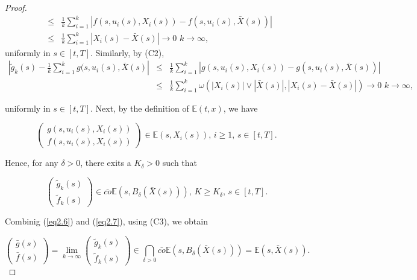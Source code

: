 \begin{proof}
\begin{eqnarray*}
            &\leq& \frac{1}{k}\sum_{i=1}^{k}|f(s,u_i(s),X_i(s))-f(s,u_i(s),\bar{X}(s))| \\
            &\leq&\frac{1}{k}\sum_{i=1}^{k}|X_i(s)-\bar{X}(s)|\to 0\,\,k\to \infty,
        \end{eqnarray*}
        uniformly in $s\in [t,T]$. Similarly, by (C2),
        \begin{eqnarray*}
        	|\tilde{g}_k(s)-\frac{1}{k}\sum_{i=1}^{k}g(s,u_i(s),\bar{X}(s)|&\leq& \frac{1}{k}\sum_{i=1}^{k}|g(s,u_i(s),X_i(s))-g(s,u_i(s),\bar{X}(s))|\\
        	&\leq&\frac{1}{k}\sum_{i=1}^{k}\omega(|X_i(s)|\vee |\bar{X}(s)|,%
        	|X_i(s)-\bar{X}(s)|)\to 0\,\,k\to \infty,
        \end{eqnarray*}
        
        uniformly in $s\in [t,T]$. Next, by the definition of $\mathbb{E}(t,x)$, we have
        
        $$\begin{pmatrix}
        	g(s,u_i(s),X_i(s)) \\ f(s,u_i(s),X_i(s))
        \end{pmatrix} \in \mathbb{E}(s,X_i(s)),\,i\geq 1,\, s\in [t,T].$$
        
        Hence, for any $\delta>0$, there exits a $K_{\delta}>0$ such that 
        
        \begin{equation}\label{eq2.7}
        	\begin{pmatrix}
        		\tilde{g}_k(s) \\ \tilde{f}_k(s)
        	\end{pmatrix}\in \bar{co}\mathbb{E}(s,B_{\delta}(\bar{X}(s))),\, K\geq K_{\delta},\, s\in[t,T].
        \end{equation}
        
        Combinig (\ref{eq2.6}) and (\ref{eq2.7}), using (C3), we obtain
        
        \begin{equation*}
        \begin{pmatrix}
        \bar{g}(s) \\ \bar{f}(s)
        \end{pmatrix}=\lim_{k\to \infty}\begin{pmatrix}
        \tilde{g}_k(s) \\ \tilde{f}_k(s)
        \end{pmatrix}\in \bigcap_{\delta>0}\bar{co}\mathbb{E}(s,B_{\delta}(\bar{X}(s)))=\mathbb{E}(s,\bar{X}(s)).
        \end{equation*}
        

\end{proof}
